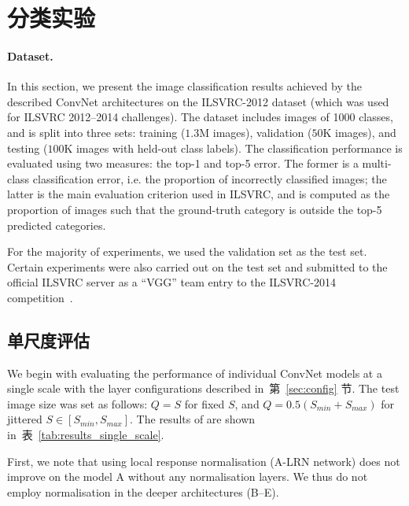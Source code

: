 \documentclass{article} %
\makeatletter
\newcommand{\tblref}[1]{表~\ref{#1}}
\newcommand{\sref}[1]{第~\ref{#1} 节}
\newcommand*{\ie}{i.e.\@\xspace}
\makeatother
\begin{document}
\section{分类实验}
\label{sec:exp}

\paragraph{Dataset.}
In this section, we present the image classification results achieved by the described ConvNet architectures on the ILSVRC-2012 dataset (which was used for ILSVRC 2012--2014 challenges).
The dataset includes images of 1000 classes, and is split into three sets: training ($1.3$M images), validation ($50$K images), and testing ($100$K images with held-out class labels).
The classification performance is evaluated using two measures: the top-1 and top-5 error. The former is a multi-class classification error, \ie the proportion of incorrectly
classified images; the latter is the main evaluation criterion used in ILSVRC, and is computed as the proportion of images such that the ground-truth category is outside the top-5 predicted categories.

For the majority of experiments, we used the validation set as the test set. Certain experiments were also carried out on the test set and submitted to the official ILSVRC server 
as a ``VGG'' team entry to the ILSVRC-2014 competition~\citep{Russakovsky14}.

\subsection{单尺度评估}

We begin with evaluating the performance of individual ConvNet models at a single scale with the layer configurations described in~\sref{sec:config}.
The test image size was set as follows: $Q=S$ for fixed $S$, and $Q=0.5(S_{min}+S_{max})$ for jittered $S \in \left[S_{min},S_{max}\right]$.
The results of are shown in~\tblref{tab:results_single_scale}.

First, we note that using local response normalisation (A-LRN network) does not improve on the model A
without any normalisation layers. We thus do not employ normalisation in the deeper architectures (B--E).
\end{document}
